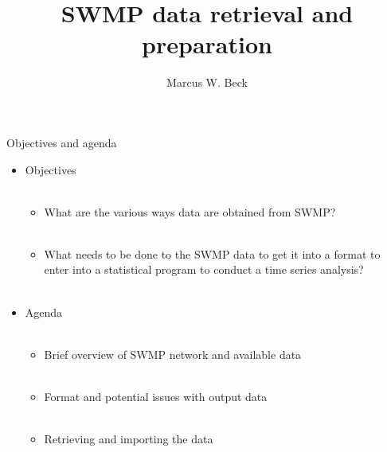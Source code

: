 \documentclass[xcolor=svgnames]{beamer}\usepackage[]{graphicx}\usepackage[]{color}
\begin{document}
\title[Overview of SWMP data]{SWMP data retrieval and preparation}

\author[M. Beck]{Marcus W. Beck}

\date{}





\begin{frame}{Objectives and agenda}
\begin{itemize}
\onslide<+->
\item Objectives \\~\\
\begin{itemize}
\item What are the various ways data are obtained from SWMP? \\~\\
\item What needs to be done to the SWMP data to get it into a format to enter into a statistical program to conduct a time series analysis? \\~\\
\end{itemize}
\onslide<+->
\item Agenda \\~\\
\begin{itemize}
\item Brief overview of SWMP network and available data \\~\\
\item Format and potential issues with output data \\~\\
\item Retrieving and importing the data \\~\\
\end{itemize}
\end{itemize}
\end{frame}
\end{document}
